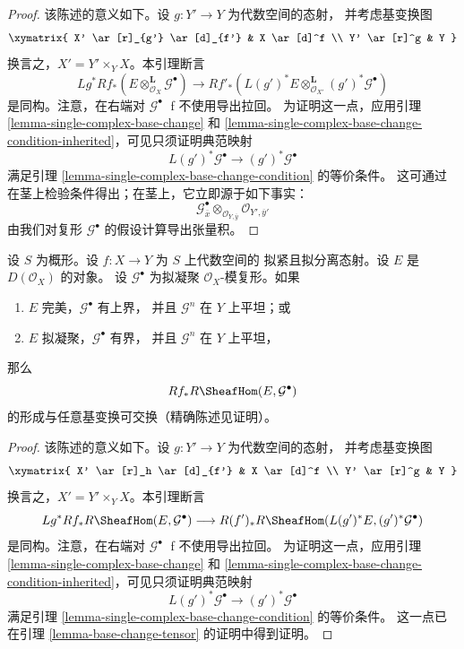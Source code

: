 \begin{proof}
该陈述的意义如下。设 $g : Y' \to Y$ 为代数空间的态射，
并考虑基变换图
$$
\xymatrix{
X' \ar[r]_{g'} \ar[d]_{f'} &
X \ar[d]^f \\
Y' \ar[r]^g &
Y
}
$$
换言之，$X' = Y' \times_Y X$。本引理断言
$$
Lg^*Rf_*(E \otimes^\mathbf{L}_{\mathcal{O}_X} \mathcal{G}^\bullet)
\longrightarrow
Rf'_*(L(g')^*E \otimes^\mathbf{L}_{\mathcal{O}_{X'}} (g')^*\mathcal{G}^\bullet)
$$
是同构。注意，在右端对 $\mathcal{G}^\bullet$ {f 不}使用导出拉回。
为证明这一点，应用引理 \ref{lemma-single-complex-base-change} 和
\ref{lemma-single-complex-base-change-condition-inherited}，可见只须证明典范映射
$$
L(g')^*\mathcal{G}^\bullet \to (g')^*\mathcal{G}^\bullet
$$
满足引理 \ref{lemma-single-complex-base-change-condition} 的等价条件。
这可通过在茎上检验条件得出；在茎上，它立即源于如下事实：
$$
\mathcal{G}^\bullet_{\overline{x}}
\otimes_{\mathcal{O}_{Y, \overline{y}}}
\mathcal{O}_{Y', \overline{y}'}
$$
由我们对复形 $\mathcal{G}^\bullet$ 的假设计算导出张量积。
\end{proof}

\begin{lemma}
\label{lemma-base-change-RHom}
设 $S$ 为概形。设 $f : X \to Y$ 为 $S$ 上代数空间的
拟紧且拟分离态射。设 $E$ 是 $D(\mathcal{O}_X)$ 的对象。
设 $\mathcal{G}^\bullet$ 为拟凝聚 $\mathcal{O}_X$-模复形。如果
\begin{enumerate}
\item $E$ 完美，$\mathcal{G}^\bullet$ 有上界，%
并且 $\mathcal{G}^n$ 在 $Y$ 上平坦；或
\item $E$ 拟凝聚，$\mathcal{G}^\bullet$ 有界，
并且 $\mathcal{G}^n$ 在 $Y$ 上平坦，
\end{enumerate}
那么
$$
Rf_*R\SheafHom(E, \mathcal{G}^\bullet)
$$
的形成与任意基变换可交换（精确陈述见证明）。
\end{lemma}

\begin{proof}
该陈述的意义如下。设 $g : Y' \to Y$ 为代数空间的态射，
并考虑基变换图
$$
\xymatrix{
X' \ar[r]_h \ar[d]_{f'} & %
X \ar[d]^f \\
Y' \ar[r]^g &
Y
}
$$
换言之，$X' = Y' \times_Y X$。本引理断言
$$
Lg^*Rf_*R\SheafHom(E, \mathcal{G}^\bullet)
\longrightarrow
R(f')_*R\SheafHom(L(g')^*E, (g')^*\mathcal{G}^\bullet)
$$
是同构。注意，在右端对 $\mathcal{G}^\bullet$ {f 不}使用导出拉回。
为证明这一点，应用引理 \ref{lemma-single-complex-base-change} 和
\ref{lemma-single-complex-base-change-condition-inherited}，可见只须证明典范映射
$$
L(g')^*\mathcal{G}^\bullet \to (g')^*\mathcal{G}^\bullet
$$
满足引理 \ref{lemma-single-complex-base-change-condition} 的等价条件。
这一点已在引理 \ref{lemma-base-change-tensor} 的证明中得到证明。
\end{proof}















